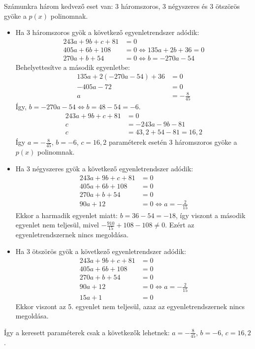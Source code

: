 \documentclass[a4paper,12pt]{article}
\theoremstyle{definition}
\begin{document}
\begin{solution}
	Számunkra három kedvező eset van: 3 háromszoros, 3 négyszeres és 3 ötszörös gyöke a $p(x)$ polinomnak.
	\begin{itemize}
		\item Ha 3 háromszoros gyök a következő egyenletrendszer adódik:
		\begin{align*}
			243a + 9b + c + 81 &= 0 \\
			405a + 6b + 108    &= 0 \iff 135a + 2b + 36 = 0 \\
			270a + b + 54      &= 0 \iff b = -270a - 54
		\end{align*}
		Behelyettesítve a második egyenletbe:
		\begin{align*}
			 135a + 2(-270a - 54) + 36 &= 0 \\
			-405a                - 72  &= 0 \\
			    a                      &= - \frac{8}{45}
		\end{align*}
		Így, $b = -270a - 54 \iff b = 48 - 54 = -6 $.
		\begin{align*}
			243a + 9b + c + 81 &= 0 \\
			c &= -243a - 9b - 81 \\
			c &= 43,2 + 54 - 81 = 16,2
		\end{align*}
		Így $ a = - \frac{8}{45} $, $ b = -6 $, $ c = 16,2 $ paraméterek esetén 3 háromszoros gyöke a $p(x)$ polinomnak.
		\item Ha 3 négyszeres gyök a következő egyenletrendszer adódik:
		\begin{align*}
			243a + 9b + c + 81 &= 0 \\
			405a + 6b + 108    &= 0 \\
			270a + b + 54      &= 0 \\
			90a + 12           &= 0 \iff a = -\frac{2}{15}
		\end{align*}
		Ekkor a harmadik egyenlet miatt: $ b = 36 - 54 = - 18 $, így viszont a második egyenlet nem teljesül, mivel $ -\frac{910}{15} + 108 - 108 \ne 0 $. Ezért az egyenletrendszernek nincs megoldása.
		\item Ha 3 ötszörös gyök a következő egyenletrendszer adódik:
		\begin{align*}
			243a + 9b + c + 81 &= 0 \\
			405a + 6b + 108    &= 0 \\
			270a + b + 54      &= 0 \\
			90a + 12           &= 0 \iff a = -\frac{2}{15} \\
			15a + 1            &= 0 
		\end{align*}
		Ekkor viszont az 5. egyenlet nem teljesül, azaz az egyenletrendszernek nincs megoldása.
	\end{itemize}
	Így a keresett paraméterek csak a következők lehetnek: $ a = - \frac{8}{45} $, $ b = -6 $, $ c = 16,2 $.
\end{solution}
\end{document}
